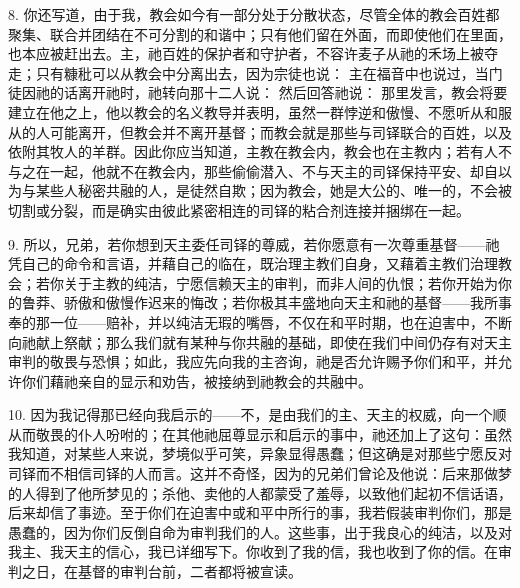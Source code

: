 8. 你还写道，由于我，教会如今有一部分处于分散状态，尽管全体的教会百姓都聚集、联合并团结在不可分割的和谐中；只有他们留在外面，而即使他们在里面，也本应被赶出去。主，祂百姓的保护者和守护者，不容许麦子从祂的禾场上被夺走；只有糠秕可以从教会中分离出去，因为宗徒也说：  主在福音中也说过，当门徒因祂的话离开祂时，祂转向那十二人说： 然后回答祂说：  那里发言，教会将要建立在他之上，他以教会的名义教导并表明，虽然一群悖逆和傲慢、不愿听从和服从的人可能离开，但教会并不离开基督；而教会就是那些与司铎联合的百姓，以及依附其牧人的羊群。因此你应当知道，主教在教会内，教会也在主教内；若有人不与之在一起，他就不在教会内，那些偷偷潜入、不与天主的司铎保持平安、却自以为与某些人秘密共融的人，是徒然自欺；因为教会，她是大公的、唯一的，不会被切割或分裂，而是确实由彼此紧密相连的司铎的粘合剂连接并捆绑在一起。\par

9. 所以，兄弟，若你想到天主委任司铎的尊威，若你愿意有一次尊重基督——祂凭自己的命令和言语，并藉自己的临在，既治理主教们自身，又藉着主教们治理教会；若你关于主教的纯洁，宁愿信赖天主的审判，而非人间的仇恨；若你开始为你的鲁莽、骄傲和傲慢作迟来的悔改；若你极其丰盛地向天主和祂的基督——我所事奉的那一位——赔补，并以纯洁无瑕的嘴唇，不仅在和平时期，也在迫害中，不断向祂献上祭献；那么我们就有某种与你共融的基础，即使在我们中间仍存有对天主审判的敬畏与恐惧；如此，我应先向我的主咨询，祂是否允许赐予你们和平，并允许你们藉祂亲自的显示和劝告，被接纳到祂教会的共融中。\par

10. 因为我记得那已经向我启示的——不，是由我们的主、天主的权威，向一个顺从而敬畏的仆人吩咐的；在其他祂屈尊显示和启示的事中，祂还加上了这句：虽然我知道，对某些人来说，梦境似乎可笑，异象显得愚蠢；但这确是对那些宁愿反对司铎而不相信司铎的人而言。这并不奇怪，因为的兄弟们曾论及他说：后来那做梦的人得到了他所梦见的；杀他、卖他的人都蒙受了羞辱，以致他们起初不信话语，后来却信了事迹。至于你们在迫害中或和平中所行的事，我若假装审判你们，那是愚蠢的，因为你们反倒自命为审判我们的人。这些事，出于我良心的纯洁，以及对我主、我天主的信心，我已详细写下。你收到了我的信，我也收到了你的信。在审判之日，在基督的审判台前，二者都将被宣读。\par


